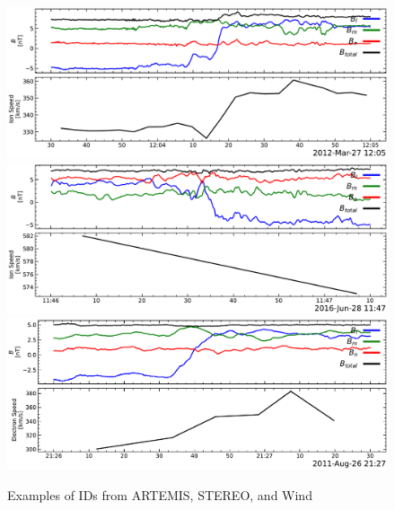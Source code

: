 \documentclass[
]{agujournal2019}
\begin{document}
\begin{figure}

\begin{minipage}{\linewidth}
\includegraphics{figures/examples/artemis_id_example.pdf}\end{minipage}%
\newline
\begin{minipage}{\linewidth}
\includegraphics{figures/examples/stereo_id_example.pdf}\end{minipage}%
\newline
\begin{minipage}{\linewidth}
\includegraphics{figures/examples/wind_id_example.pdf}\end{minipage}%
\newline
\begin{minipage}{\linewidth}
Examples of IDs from ARTEMIS, STEREO, and Wind\end{minipage}%

\end{figure}%
\end{document}
